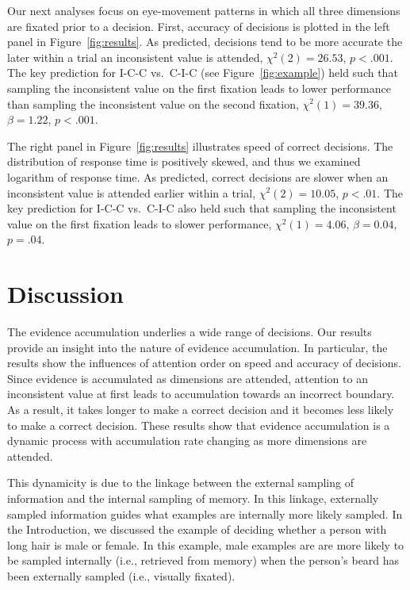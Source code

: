\documentclass[man,floatsintext]{apa6}
\begin{document}
Our next analyses focus on eye-movement patterns in which all three dimensions are fixated prior to
a decision.  First, accuracy of decisions is plotted in the left panel in Figure~\ref{fig:results}.
As predicted, decisions tend to be more accurate the later within a trial an inconsistent value is
attended, $\chi^{2}(2)=26.53$, $p<.001$. The key prediction for I-C-C vs.\ C-I-C (see
Figure~\ref{fig:example}) held such that sampling the inconsistent value on the first fixation leads
to lower performance than sampling the inconsistent value on the second fixation,
$\chi^{2}(1)=39.36$, $\beta=1.22$, $p<.001$.

The right panel in Figure~\ref{fig:results} illustrates speed of correct decisions.  The
distribution of response time is positively skewed, and thus we examined logarithm of response time.
As predicted, correct decisions are slower when an inconsistent value is attended earlier within a
trial, $\chi^{2}(2)=10.05$, $p<.01$. The key prediction for I-C-C vs.\ C-I-C also held such that
sampling the inconsistent value on the first fixation leads to slower performance,
$\chi^{2}(1)=4.06$, $\beta=0.04$, $p=.04$.


\section{Discussion}

The evidence accumulation underlies a wide range of decisions. Our results provide an insight into
the nature of evidence accumulation.  In particular, the results show the influences of attention
order on speed and accuracy of decisions.  Since evidence is accumulated as dimensions are attended,
attention to an inconsistent value at first leads to accumulation towards an incorrect
boundary.  As a result, it takes longer to make a correct decision and it becomes less likely to
make a correct decision.  These results show that evidence accumulation is a dynamic process with
accumulation rate changing as more dimensions are attended.

This dynamicity is due to the linkage between the external sampling of information and the internal
sampling of memory. In this linkage, externally sampled information guides what examples are
internally more likely sampled. In the Introduction, we discussed the example of deciding whether a
person with long hair is male or female. In this example, male examples are are more likely to be
sampled internally (i.e., retrieved from memory) when the person's beard has been externally sampled
(i.e., visually fixated).
\end{document}
